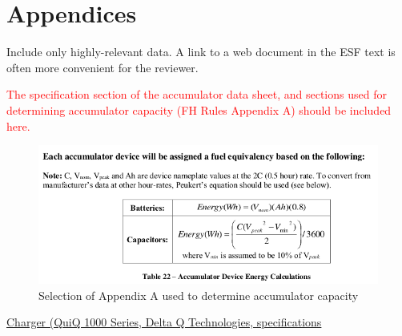 \documentclass{article}
\begin{document}
\section{Appendices}

Include only highly-relevant data. A link to a web document in the ESF text is often more convenient for the reviewer.

\textcolor{red}{The specification section of the accumulator data sheet, and sections used for determining accumulator capacity (FH Rules Appendix A) should be included here.}



%






\begin{figure}[H]
    \centering
    \includegraphics[width = 0.7 \textwidth]{appendixa}
    \caption{Selection of Appendix A used to determine accumulator capacity}
    \label{appendixa}
\end{figure}

\href{http://delta-q.com/product/quiq-1000-industrial-battery-charger/}{Charger (QuiQ 1000 Series, Delta Q Technologies, specifications }
\end{document}
